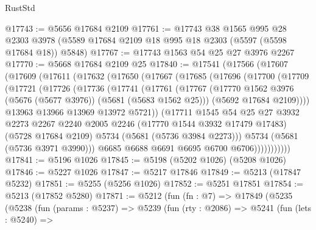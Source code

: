 \begin{lexlean}{RustStd}
\begin{coremodule}
@17743 := @5656 @17684 @2109
@17761 := @17743
    @38
    @1565
    @995
    @28
    @2303
    @3978
    (@5589 @17684 @2109 @18 @995 @18 @2303 (@5597 (@5598 @17684 @18)) @5848)
@17767 := @17743 @1563 @54 @25 @27 @3976 @2267
@17770 := @5668 @17684 @2109 @25
@17840 := @17541
    (@17566
      (@17607
        (@17609
          (@17611
            (@17632
              (@17650
                (@17667
                  (@17685
                    (@17696
                      (@17700
                        (@17709
                          (@17721
                            (@17726
                              (@17736
                                (@17741
                                  (@17761
                                    (@17767
                                      (@17770
                                        @1562
                                        @3976
                                        (@5676 (@5677 @3976))
                                        (@5681 (@5683 @1562 @25)))
                                      (@5692 @17684 @2109))))
                                @13963
                                @13966
                                @13969
                                @13972
                                @5721))
                            (@17711
                              @1545
                              @54
                              @25
                              @27
                              @3932
                              @2273
                              @2267
                              @2240
                              @2005
                              @2246
                              (@17770 @1544 @3932 @17479 @17483)
                              (@5728 @17684 @2109)
                              @5734
                              (@5681 (@5736 @3984 @2273)))
                            @5734
                            (@5681 (@5736 @3971 @3990)))
                          @6685
                          @6688
                          @6691
                          @6695
                          @6700
                          @6706)))))))))))
@17841 := @5196 @1026
@17845 := @5198 (@5202 @1026) (@5208 @1026)
@17846 := @5227 @1026
@17847 := @5217 @17846
@17849 := @5213 (@17847 @5232)
@17851 := @5255 (@5256 @1026)
@17852 := @5251 @17851
@17854 := @5213 (@17852 @5280)
@17871 := @5212
    (fun (fn : @7) =>
    @17849
      (@5235
        (@5238
          (fun (params : @5237) =>
          @5239
            (fun (rty : @2086) =>
            @5241
              (fun (lets : @5240) =>

\end{coremodule}
\end{lexlean}

